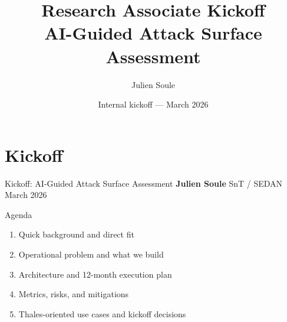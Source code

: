\documentclass[10pt,aspectratio=169]{beamer}
\title[AI-Guided Attack Surface Assessment]{Research Associate Kickoff\\AI-Guided Attack Surface Assessment}
\author{Julien Soule}
\institute{SnT / SEDAN --- University of Luxembourg}
\date{Internal kickoff --- March 2026}
\begin{document}
\section{Kickoff}
\begin{frame}{Kickoff: AI-Guided Attack Surface Assessment}
    \textbf{Julien Soule} \hfill SnT / SEDAN \hfill March 2026

    \vspace{0.4em}
    \begin{block}{Agenda}
        \begin{enumerate}
            \item Quick background and direct fit
            \item Operational problem and what we build
            \item Architecture and 12-month execution plan
            \item Metrics, risks, and mitigations
            \item Thales-oriented use cases and kickoff decisions
        \end{enumerate}
    \end{block}
\end{frame}
\end{document}
